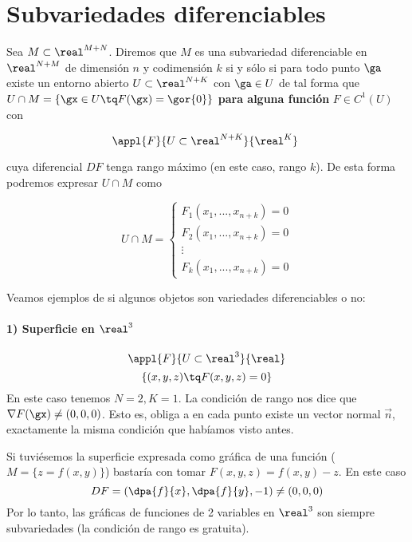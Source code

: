  	\section{Subvariedades diferenciables}
  
  \begin{defn}\label{defSubDif}
  Sea $M \subset \real^{M+N}$. Diremos que $M$ es una subvariedad diferenciable en $\real^{N+M}$ de dimensión $n$ y codimensión $k$ si y sólo si para todo punto $\ga$ existe un entorno abierto $U \subset \real^{N+K}$ con $\ga \in U$ de tal forma que $U \cap M = \{\gx\in U\tq F(\gx) = \gor{0}\}$ \textbf{para alguna función} $F\in C^1(U)$ con 
  
  \[\appl{F}{U\subset \real^{N+K}}{\real^K} \]
  
  cuya diferencial $DF$ tenga rango máximo (en este caso, rango $k$). De esta forma podremos expresar $U\cap M$ como 
  
  \[U\cap M = \left\{\begin{array}{cc}
                     F_1(x_1,...,x_{n+k}) = 0\\
                     F_2(x_1,...,x_{n+k}) = 0\\
                     \vdots\\
                     F_k(x_1,...,x_{n+k}) = 0
                    \end{array}\right.\] 
                    
  \end{defn}
  

Veamos ejemplos de si algunos objetos son variedades diferenciables o no:
\paragraph{1) Superficie en $\real^3$} 
  \[\appl{F}{U\subset\real^3}{\real}\]
  \[\{(x,y,z) \tq F(x,y,z) = 0\}\]
  En este caso tenemos $N=2, K=1$.
  La condición de rango nos dice que $\nabla F(\gx) \neq (0,0,0)$. Esto es, obliga a en cada punto existe un vector normal $\overrightarrow{n}$, exactamente la misma condición que habíamos visto antes.
  
  \begin{remark} Si tuviésemos la superficie expresada como gráfica de una función ($M = \{z = f(x,y)\}$) bastaría con tomar $F(x,y,z) = f(x,y)-z$. En este caso
  \[DF = \left(\dpa{f}{x},\dpa{f}{y},-1\right) \neq (0,0,0)\]
  Por lo tanto, las gráficas de funciones de 2 variables en $\real^3$ son siempre subvariedades (la condición de rango es gratuita).
  \end{remark}
  
